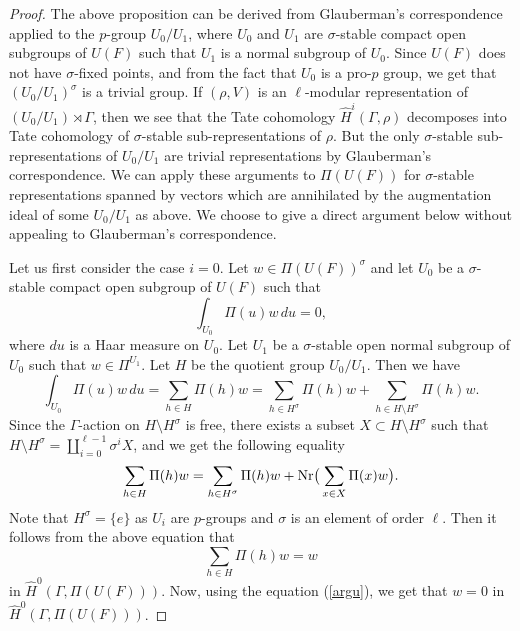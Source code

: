 \documentclass[10pt, reqno]{amsart}
\theoremstyle{plain}
\numberwithin{equation}{section}
\begin{document}
\begin{proof}
  The above proposition can be derived from Glauberman's
  correspondence applied to the $p$-group $U_0/U_1$, where $U_0$ and
  $U_1$ are $\sigma$-stable compact open subgroups of $U(F)$ such that
  $U_1$ is a normal subgroup of $U_0$. Since $U(F)$ does not have
  $\sigma$-fixed points, and from the fact that $U_0$ is a pro-$p$
  group, we get that $(U_0/U_1)^\sigma$ is a trivial group.  If
  $(\rho, V)$ is an $\ell$-modular representation of
  $(U_0/U_1)\rtimes \Gamma$, then we see that the Tate cohomology
  $\widehat{H}^i(\Gamma, \rho)$ decomposes into Tate cohomology of
  $\sigma$-stable sub-representations of $\rho$. But the only
  $\sigma$-stable sub-representations of $U_0/U_1$ are trivial
  representations by Glauberman's correspondence. We can apply these
  arguments to $\Pi(U(F))$ for $\sigma$-stable representations spanned
  by vectors which are annihilated by the augmentation ideal of some
  $U_0/U_1$ as above. We choose to give a direct argument below
  without appealing to Glauberman's correspondence.

Let us first consider the case $i=0$.
Let $w\in \Pi(U(F))^\sigma$ and let $U_0$ be a $\sigma$-stable
 compact open subgroup of $U(F)$
 such that 
 \begin{equation}\label{argu}
\int_{U_0}\Pi(u)w\,du=0,
 \end{equation}
 where $du$ is a Haar measure on $U_0$. Let $U_1$ be a $\sigma$-stable
 open normal subgroup of $U_0$ such that $w\in \Pi^{U_1}$. Let $H$ be
 the quotient group $U_0/U_1$. Then we have
$$ \int_{U_0}\Pi(u)w\,du = \sum_{h\in H} \Pi(h)w = \sum_{h\in H^\sigma} \Pi(h)w +
\sum_{h\in H\setminus H^\sigma} \Pi(h)w. $$ Since the $\Gamma$-action
on $H\setminus H^\sigma$ is free, there exists a subset
$X\subset H\setminus H^\sigma$ such that
$H\setminus H^\sigma = \coprod_{i=0}^{\ell-1}\sigma^iX$, and we get
the following equality
$$
\sum_{h\in H} \Pi(h)w = \sum_{h\in H^\sigma} \Pi(h)w + {\rm
  Nr}\big(\sum_{x\in X}\Pi(x)w\big).
$$
Note that $H^\sigma = \{e\}$ as $U_i$ are $p$-groups and $\sigma$ is
an element of order $\ell$. Then it follows from the above equation
that
$$ \sum_{h\in H} \Pi(h)w = w $$
in $\widehat{H}^0(\Gamma, \Pi(U(F)))$. Now, using the equation
(\ref{argu}), we get that $w=0$ in $\widehat{H}^0(\Gamma,\Pi(U(F)))$.


\end{proof}
\end{document}
